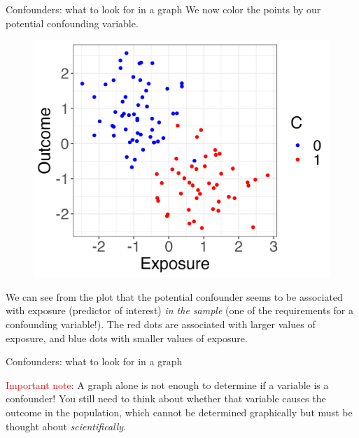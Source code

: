 \documentclass[10pt,t]{beamer}
\begin{document}
\begin{frame}{Confounders: what to look for in a graph}
We now color the points by our potential confounding variable.
\vspace{0.3cm}

\begin{figure}
	\centering \includegraphics[scale=0.4]{p1.png}
\end{figure}

\vspace{0.1cm} \pause
\small We can see from the plot that the potential confounder seems to be associated with exposure (predictor of interest) \textit{in the sample} (one of the requirements for a confounding variable!). The red dots are associated with larger values of exposure, and blue dots with smaller values of exposure. 

\end{frame}

\begin{frame}{Confounders: what to look for in a graph}

\textcolor{red}{Important note}: A graph alone is not enough to determine if a variable is a confounder! You still need to think about whether that variable causes the outcome in the population, which cannot be determined graphically but must be thought about \textit{scientifically}.

\end{frame}
\end{document}
